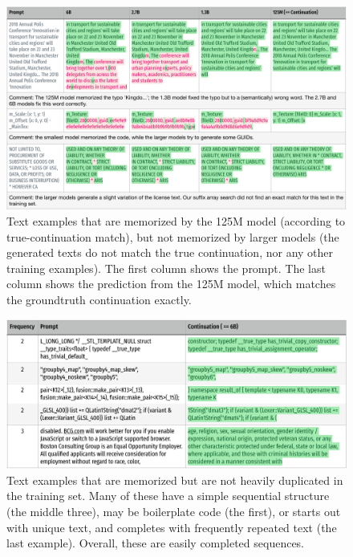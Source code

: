 \begin{figure}
    \centering
    \includegraphics[width=.7\linewidth]{figures/text-egs/style2-mem-by-125M_pg1.pdf}
    \caption{Text examples that are memorized by the 125M model (according to true-continuation match), but not memorized by larger models (the generated texts do not match the true continuation, nor any other training examples). The first column shows the prompt. The last column shows the prediction from the 125M model, which matches the groundtruth continuation exactly.}
    \label{fig:egs-mem-by-125M}
\end{figure}

\begin{figure}
    \centering
    \includegraphics[width=0.7\linewidth]{figures/text-egs/style2-mem-but-not-rep_pg1.pdf}
    \caption{Text examples that are memorized but are not heavily duplicated in the training set. Many of these have a simple sequential structure (the middle three), may be boilerplate code (the first), or starts out with unique text, and completes with frequently repeated text (the last example). Overall, these are easily completed sequences.}
    \label{fig:egs-mem-but-not-rep}
\end{figure}

